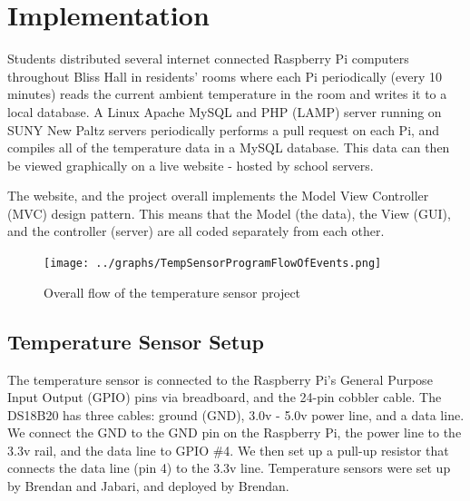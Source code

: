 \documentclass{article}
\begin{document}
			
	\newpage
	\section{Implementation}\label{sec:implementation}
	
		Students distributed several internet connected Raspberry Pi computers throughout Bliss Hall in residents' rooms
		where each Pi periodically (every 10 minutes) reads the current ambient temperature in the room and writes it to a local database. A 
		Linux Apache MySQL and PHP (LAMP) server running on SUNY New Paltz servers periodically performs a pull request on
		each Pi, and compiles all of the temperature data in a MySQL database. This data can then be viewed graphically on a 
		live website - hosted by school servers.	
		
		The website, and the project overall implements the Model View Controller (MVC) design pattern. This means that the Model (the data),
		the View (GUI), and the controller (server) are all coded separately from each other. 
		
		\begin{figure} [H]
			\begin{center}
				\texttt{[image: ../graphs/TempSensorProgramFlowOfEvents.png]}
			\end{center}
			\captionsetup{labelformat=empty}
			\caption{Overall flow of the temperature sensor project}
		\end{figure}
		
			
	\newpage
			
		\subsection{Temperature Sensor Setup}	
			The temperature sensor is connected to the Raspberry Pi's General Purpose Input Output (GPIO) pins via breadboard, 
			and the 24-pin cobbler cable. The DS18B20 has three cables: ground (GND), 3.0v - 5.0v power line, and a data line. 
			We connect the GND to the GND pin on the Raspberry Pi, the power line to the 3.3v rail, and the data line to GPIO \#4.
		 	We then set up a pull-up resistor that connects the data line (pin 4) to the 3.3v line. Temperature sensors were set
		 	up by Brendan and Jabari, and deployed by Brendan.
							
\end{document}
